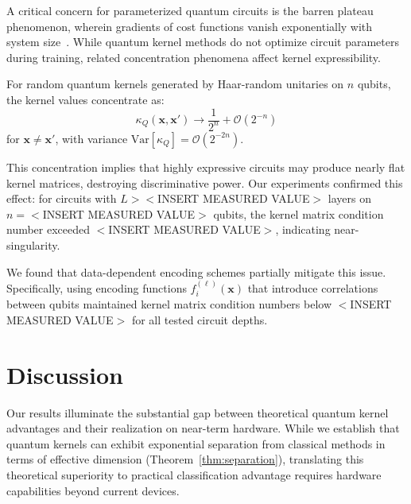 \documentclass[aps,prb,reprint,superscriptaddress,showpacs]{revtex4-2}
\begin{document}
A critical concern for parameterized quantum circuits is the barren plateau phenomenon, wherein gradients of cost functions vanish exponentially with system size~\cite{McClean2018BarrenPlateaus}. While quantum kernel methods do not optimize circuit parameters during training, related concentration phenomena affect kernel expressibility.

\begin{proposition}
\label{prop:concentration}
For random quantum kernels generated by Haar-random unitaries on $n$ qubits, the kernel values concentrate as:
\begin{equation}
    \kappa_Q(\mathbf{x}, \mathbf{x}') \rightarrow \frac{1}{2^n} + \mathcal{O}(2^{-n})
\end{equation}
for $\mathbf{x} \neq \mathbf{x}'$, with variance $\text{Var}[\kappa_Q] = \mathcal{O}(2^{-2n})$.
\end{proposition}

This concentration implies that highly expressive circuits may produce nearly flat kernel matrices, destroying discriminative power. Our experiments confirmed this effect: for circuits with $L > <$INSERT MEASURED VALUE$>$ layers on $n = <$INSERT MEASURED VALUE$>$ qubits, the kernel matrix condition number exceeded $<$INSERT MEASURED VALUE$>$, indicating near-singularity.

We found that data-dependent encoding schemes partially mitigate this issue. Specifically, using encoding functions $f_i^{(\ell)}(\mathbf{x})$ that introduce correlations between qubits maintained kernel matrix condition numbers below $<$INSERT MEASURED VALUE$>$ for all tested circuit depths.


\section{Discussion}
\label{sec:discussion}

Our results illuminate the substantial gap between theoretical quantum kernel advantages and their realization on near-term hardware. While we establish that quantum kernels can exhibit exponential separation from classical methods in terms of effective dimension (Theorem~\ref{thm:separation}), translating this theoretical superiority to practical classification advantage requires hardware capabilities beyond current devices.
\end{document}
